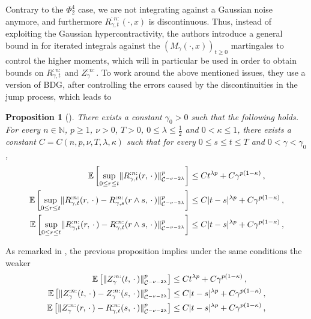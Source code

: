 \documentclass{report}
\newcommand{\NN}{\mathbb{N}}
\DeclarePairedDelimiter\abs{\lvert}{\rvert} %
\DeclarePairedDelimiter\norm{\lVert}{\rVert}%
\newcommand{\Exp}[1]{\mathbb{E}\left[#1\right]}
\newcommand{\Placeholder}{\,\mathrel{\cdot}\,}
\newtheorem{proposition}[theorem]{Proposition}
\theoremstyle{remark}
\theoremstyle{definition}
\begin{document}
Contrary to the $\Phi^4_2$ case, we are not integrating against a Gaussian noise anymore, and furthermore $R^{:n:}_{\gamma, t}(\cdot, x)$ is discontinuous. Thus, instead of exploiting the Gaussian hypercontractivity, the authors introduce a general bound in \cite[Lemma 4.1.]{mourrat2015convergencetwodimensionaldynamicisingkac} for iterated integrals against the $(M_\gamma(\cdot, x))_{t \ge 0}$ martingales to control the higher moments, which will in particular be used in order to obtain bounds on $R^{:n:}_{\gamma, t}$ and $Z^{:n:}_\gamma$. To work around the above mentioned issues, they use a version of BDG, after controlling the errors caused by the discontinuities in the jump process, which leads to
\begin{proposition}[{\cite[Proposition 4.2.]{mourrat2015convergencetwodimensionaldynamicisingkac}}]
  \label{prop:bounds_proposition_4.2}
  There exists a constant $\gamma_0 > 0$ such that the following holds. For every $n \in \NN$, $p \ge 1$, $\nu > 0$, $T > 0$, $0\le \lambda \le \frac{1}{2}$ and $0 < \kappa \le 1$, there exists a constant $C = C(n, p, \nu, T, \lambda, \kappa)$ such that for every $0 \le s \le t \le T$ and $0 < \gamma < \gamma_0$,
  \begin{align*}
    \Exp{\sup_{0\le r \le t} \norm{R^{:n:}_{\gamma, t}(r, \Placeholder)}^p_{\mathcal{C}^{-\nu-2\lambda}}} &\le C t^{\lambda p} + C \gamma^{p(1-\kappa)}\,,\\
    \Exp{\sup_{0\le r \le t} \norm{R^{:n:}_{\gamma, t}(r, \Placeholder) - R^{:n:}_{\gamma, s}(r \land s, \Placeholder)}^p_{\mathcal{C}^{-\nu-2\lambda}}} &\le C \abs{t -s}^{\lambda p} + C \gamma^{p(1-\kappa)}\,,\\
    \Exp{\sup_{0\le r \le t} \norm{R^{:n:}_{\gamma, t}(r, \Placeholder) - R^{:n:}_{\gamma, t}(r \land s, \Placeholder)}^p_{\mathcal{C}^{-\nu-2\lambda}}} &\le C \abs{t -s}^{\lambda p} + C \gamma^{p(1-\kappa)}\,,
  \end{align*}
\end{proposition}
As remarked in \cite[Remark 4.3.]{mourrat2015convergencetwodimensionaldynamicisingkac}, the previous proposition implies under the same conditions the weaker
\begin{align*}
      \Exp{ \norm{Z^{:n:}_{\gamma}(t, \Placeholder)}^p_{\mathcal{C}^{-\nu-2\lambda}}} &\le C t^{\lambda p} + C \gamma^{p(1-\kappa)}\,,\\
    \Exp{\norm{Z^{:n:}_{\gamma}(t, \Placeholder) - Z^{:n:}_{\gamma}(s, \Placeholder)}^p_{\mathcal{C}^{-\nu-2\lambda}}} &\le C \abs{t -s}^{\lambda p} + C \gamma^{p(1-\kappa)}\,,\\
    \Exp{\norm{Z^{:n:}_{\gamma}(r, \Placeholder) - R^{:n:}_{\gamma, t}(s, \Placeholder)}^p_{\mathcal{C}^{-\nu-2\lambda}}} &\le C \abs{t -s}^{\lambda p} + C \gamma^{p(1-\kappa)}\,,
\end{align*}
\end{document}
